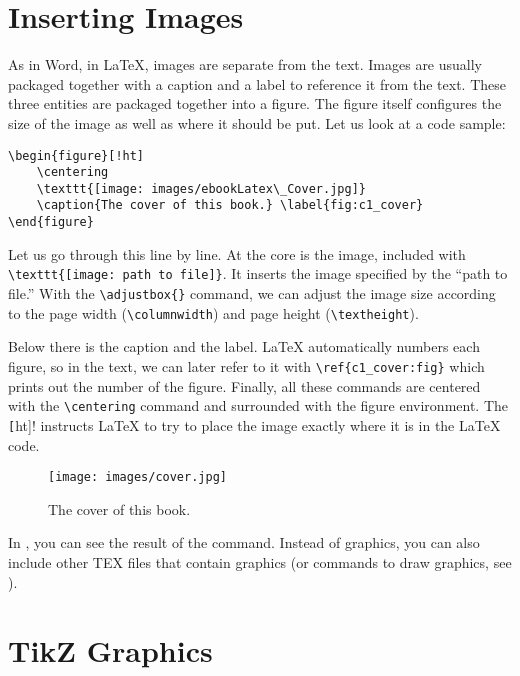\section{Inserting Images}\label{sec:c1_images}

As in Word, in \LaTeX{}, images are separate from the text. Images are usually
packaged together with a caption and a label to reference it from the text.
These three entities are packaged together into a figure. The figure itself
configures the size of the image as well as where it should be put. Let us look
at a code sample:
\begin{lstlisting}[language=Tex]
\begin{figure}[!ht]
    \centering
    \texttt{[image: images/ebookLatex\_Cover.jpg]}
    \caption{The cover of this book.} \label{fig:c1_cover}
\end{figure}
\end{lstlisting}

Let us go through this line by line. At the core is the image, included with
\lstinline[language=Tex]!\texttt{[image: path to file]}!. It inserts the image
specified by the ``path to file.'' With the
\lstinline[language=Tex]!\adjustbox{}! command, we can adjust the image size
according to the page width (\lstinline[language=Tex]!\columnwidth!) and page
height (\lstinline[language=Tex]!\textheight!). 

Below there is the caption and the label. \LaTeX{} automatically numbers each
figure, so in the text, we can later refer to it with
\lstinline[language=Tex]!\ref{c1_cover:fig}! which prints out the number of the
figure. Finally, all these commands are centered with the
\lstinline[language=Tex]!\centering! command and surrounded with the figure
environment. The \lstinline[language=Tex]![!ht]! instructs \LaTeX{} to try to
place the image exactly where it is in the \LaTeX{} code.

\begin{figure}[!ht]
	\centering
	\texttt{[image: images/cover.jpg]}
	\caption{The cover of this book.}\label{fig:c1_cover}
\end{figure}

In , you can see the result of the command. Instead of
graphics, you can also include other TEX files that contain graphics (or
commands to draw graphics, see ).

\section{TikZ Graphics}\label{sec:c1_tikzgraphics}

